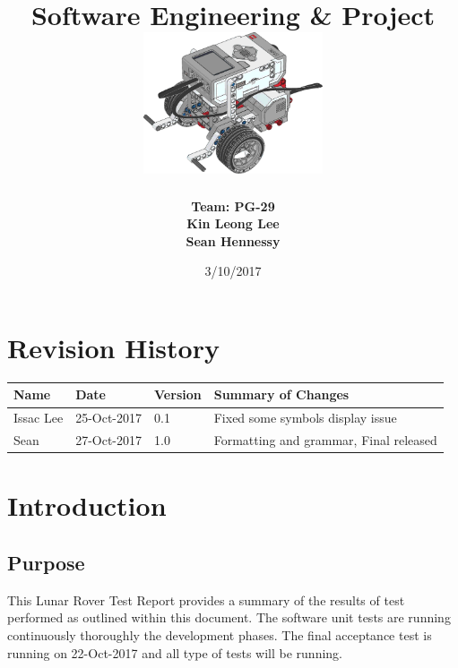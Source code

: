 \documentclass[10pt,a4paper,titlepage]{article}
\begin{document}
	
	\begin{titlepage}
		
		\title{
			\fontsize{50}{12}\\
			\vspace{20pt}
			\fontsize{20}{12}\\
			\vspace{10pt}
			\large{Software Engineering \& Project} \\
			\vspace{20pt}
			\includegraphics[width=200px]{title-page-ev3.png}					
		}
		\date{3/10/2017}
		\author{
			\bf{Team: PG-29} \\
			Kin Leong Lee \\
			Sean Hennessy
		}
		\maketitle
	\end{titlepage}
		 
	\tableofcontents	
	\listoftables
		
	\section*{Revision History}	
	\label{revtable}	
	\begin{tabular}{|p{2.1cm}|p{2.5cm}|p{2cm}|p{4.1cm}|}		
		\hline 
		\textbf {Name} & \textbf{Date} & \textbf {Version} &\textbf {Summary of Changes} \\ \hline
		Issac Lee & 25-Oct-2017 & 0.1 & Fixed some symbols display issue\\ \hline
		Sean & 27-Oct-2017 & 1.0 & Formatting and grammar, Final released\\ \hline	
	\end{tabular}

	\newpage	
	\section{Introduction}
		\subsection{Purpose}
		This Lunar Rover Test Report provides a summary of the results of test performed as outlined within this document. The software unit tests are running continuously thoroughly the development phases. The final acceptance test is running on 22-Oct-2017 and all type of tests will be running.
	
\end{document}
